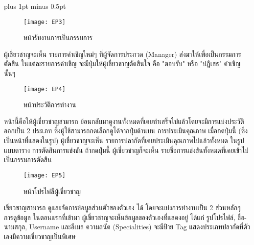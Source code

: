 
\clearpage
\thispagestyle{plain}

\begingroup
\fontsize{16pt}{19.2pt}\selectfont
\justifying
\XeTeXlinebreakskip=0pt plus 1pt minus 0.5pt
\setlength{\parindent}{1.5cm}
\setlength{\parskip}{0pt}

\begin{figure}[h]
	\centering
	\texttt{[image: EP3]}
	\caption{หน้ารับงานการเป็นกรรมการ}
\end{figure}

\indent ผู้เชี่ยวชาญจะเห็น รายการคำเชิญใหม่ๆ ที่ผู้จัดการประกวด (Manager) ส่งมาให้เพื่อเป็นกรรมการตัดสิน
ในแต่ละรายการคำเชิญ จะมีปุ่มให้ผู้เชี่ยวชาญตัดสินใจ คือ "ตอบรับ" หรือ "ปฏิเสธ" คำเชิญนั้นๆ 

\vspace{\baselineskip}

\begin{figure}[h]
	\centering
	\texttt{[image: EP4]}
	\caption{หน้าประวัติการทำงาน}
\end{figure}

\indent หน้านี้คือให้ผู้เชี่ยวชาญสามารถ ย้อนกลับมาดูงานทั้งหมดที่เคยทำเสร็จไปแล้วโดยจะมีการแบ่งประวัติออกเป็น 2 ประเภท ซึ่งผู้ใช้สามารถกดเลือกดูได้จากปุ่มด้านบน การประเมินคุณภาพ เมื่อกดปุ่มนี้ (ซึ่งเป็นหน้าที่แสดงในรูป) ผู้เชี่ยวชาญจะเห็น รายการปลากัดที่เคยประเมินคุณภาพไปแล้วทั้งหมด ในรูปแบบตาราง การตัดสินการแข่งขัน 
ถ้ากดปุ่มนี้ ผู้เชี่ยวชาญก็จะเห็น รายชื่อการแข่งขันทั้งหมดที่เคยเข้าไปเป็นกรรมการตัดสิน

\newpage

\begin{figure}[h]
	\centering
	\texttt{[image: EP5]}
	\caption{หน้าโปรไฟลืผู้เชี่ยวชาญ}
\end{figure}

\indent  เชี่ยวชาญสามารถ ดูและจัดการข้อมูลส่วนตัวของตัวเอง ได้ โดยจะแบ่งการทำงานเป็น 2 ส่วนหลักๆ การดูข้อมูล ในตอนแรกที่เข้ามา ผู้เชี่ยวชาญจะเห็นข้อมูลของตัวเองที่แสดงอยู่ ได้แก่ รูปโปรไฟล์, ชื่อ-นามสกุล, Username และอีเมล ความถนัด (Specialities) จะมีป้าย Tag แสดงประเภทปลากัดที่ตัวเองมีความเชี่ยวชาญเป็นพิเศษ 

\endgroup